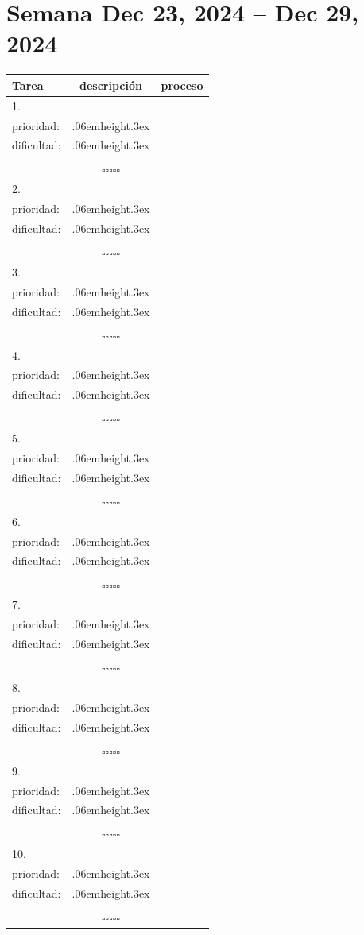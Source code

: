 \documentclass[a4paper,12pt, tikz]{scrartcl}
\newcommand\Vtextvisiblespace[1][.3em]{%
  \mbox{\kern.06em\vrule height.3ex}%
  \vbox{\hrule width#1}%
  \hbox{\vrule height.3ex}}
\newcommand{\subtablaDescrip}{ \begin{tabular}{ll}&\\ prioridad: & \Vtextvisiblespace[2em] \\ dificultad: & \Vtextvisiblespace[2em]\\&\\ \end{tabular}}
\begin{document}
\section*{Semana Dec 23, 2024 -- Dec 29, 2024}
\thispagestyle{empty}
\noindent
\begin{tabularx}{\linewidth}{|X|c c|}
    \hline
  \textbf{Tarea} & \textbf{descripción} & \textbf{proceso}\\
  \hline
   1.\vspace{4ex} &      \subtablaDescrip     & $\square\square\square\square\square$ \\
  \hline
  2.\vspace{4ex} &      \subtablaDescrip     & $\square\square\square\square\square$ \\
  \hline
  3.\vspace{4ex} &      \subtablaDescrip     & $\square\square\square\square\square$ \\
  \hline
  4.\vspace{4ex} &      \subtablaDescrip     & $\square\square\square\square\square$ \\
  \hline
  5.\vspace{4ex} &      \subtablaDescrip     & $\square\square\square\square\square$ \\
  \hline
  6.\vspace{4ex} &      \subtablaDescrip     & $\square\square\square\square\square$ \\
  \hline
  7.\vspace{4ex} &      \subtablaDescrip     & $\square\square\square\square\square$ \\
  \hline
  8.\vspace{4ex} &      \subtablaDescrip     & $\square\square\square\square\square$ \\
  \hline
  9.\vspace{4ex} &      \subtablaDescrip     & $\square\square\square\square\square$ \\
  \hline
  10.\vspace{4ex} &      \subtablaDescrip     & $\square\square\square\square\square$ \\
  \hline
\end{tabularx}

\newpage
\end{document}
